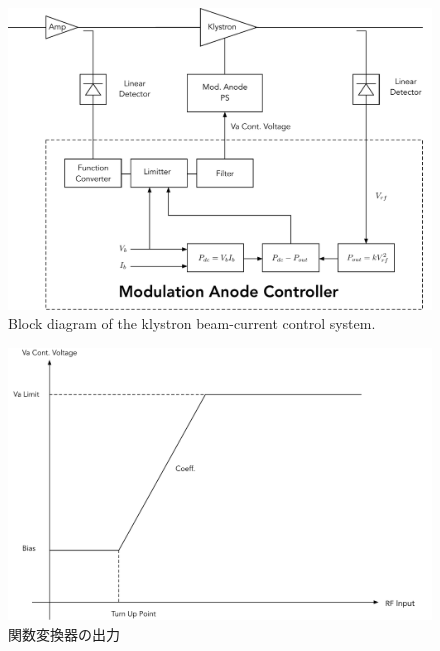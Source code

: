 \documentclass[article]{jlreq}
\begin{document}
\begin{figure}[hbt]
    \begin{center}
        \includegraphics[width=\linewidth]{figs/Mod_Anode.pdf}
        \caption{Block diagram of the klystron beam-current control system.}
        \label{mod_anode}
    \end{center}
\end{figure}
%
\begin{figure}[hbt]
    \begin{center}
        \includegraphics[width=\linewidth]{figs/Func_Conv.pdf}
        \caption{関数変換器の出力}
        \label{func_conv}
    \end{center}
\end{figure}

%
\end{document}
